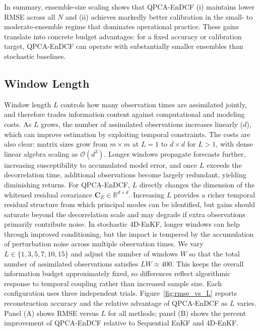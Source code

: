 \documentclass[11pt,a4paper]{article}
\begin{document}
In summary, ensemble-size scaling shows that QPCA-EnDCF (i) maintains lower RMSE across all $N$ and (ii) achieves markedly better calibration in the small- to moderate-ensemble regime that dominates operational practice. These gains translate into concrete budget advantages: for a fixed accuracy or calibration target, QPCA-EnDCF can operate with substantially smaller ensembles than stochastic baselines.






\subsection{Window Length}
\label{subsec:operational_window_length}

Window length $L$ controls how many observation times are assimilated jointly, and therefore trades information content against computational and modeling costs. As $L$ grows, the number of assimilated observations increases linearly ($d$), which can improve estimation by exploiting temporal constraints. The costs are also clear: matrix sizes grow from $m\times m$ at $L=1$ to $d\times d$ for $L>1$, with dense linear algebra scaling as $\mathcal{O}(d^3)$. Longer windows propagate forecasts further, increasing susceptibility to accumulated model error, and once $L$ exceeds the decorrelation time, additional observations become largely redundant, yielding diminishing returns. For QPCA-EnDCF, $L$ directly changes the dimension of the whitened residual covariance $\mathbf{C}_E\in\mathbb{R}^{d\times d}$. Increasing $L$ provides a richer temporal residual structure from which principal modes can be identified, but gains should saturate beyond the decorrelation scale and may degrade if extra observations primarily contribute noise. In stochastic 4D-EnKF, longer windows can help through improved conditioning, but the impact is tempered by the accumulation of perturbation noise across multiple observation times. We vary $L\in\{1,3,5,7,10,15\}$ and adjust the number of windows $W$ so that the total number of assimilated observations satisfies $LW\approx 400$. This keeps the overall information budget approximately fixed, so differences reflect algorithmic response to temporal coupling rather than increased sample size. Each configuration uses three independent trials. Figure~\ref{fig:rmse_vs_L} reports reconstruction accuracy and the relative advantage of QPCA-EnDCF as $L$ varies. Panel (A) shows RMSE versus $L$ for all methods; panel (B) shows the percent improvement of QPCA-EnDCF relative to Sequential EnKF and 4D-EnKF.
\end{document}
